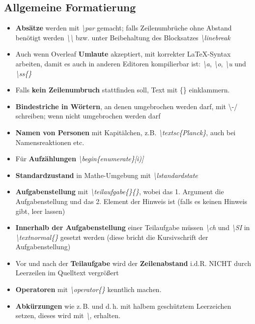 \documentclass[./main.tex]{subfiles}
\begin{document}
\subsection{Allgemeine Formatierung}
\begin{itemize}
    \item \textbf{Abs\"atze} werden mit \hypertarget{par}{\textit{\textbackslash par}} gemacht; falls Zeilenumbr\"uche ohne Abstand ben\"otigt werden \hypertarget{textbackslash}{\textit{\textbackslash\textbackslash}} bzw. unter Beibehaltung des Blocksatzes \textit{\hypertarget{linebreak}{\textbackslash linebreak}}
    \item Auch wenn Overleaf \textbf{Umlaute} akzeptiert, mit korrekter \LaTeX-Syntax arbeiten, damit es auch in anderen Editoren kompilierbar ist: \hypertarget{a}{\textit{\textbackslash\grqq{}a}}, \hypertarget{o}{\textit{\textbackslash\grqq{}o}}, \hypertarget{u}{\textit{\textbackslash\grqq{}u}} und \hypertarget{ss}{\textit{\textbackslash ss\{\}}}
    \item Falls \textbf{kein Zeilenumbruch} stattfinden soll, Text mit \{\} einklammern.  
    \item \textbf{Bindestriche in W\"ortern}, an denen umgebrochen werden darf, mit \textbackslash -/ schreiben; wenn nicht umgebrochen werden darf 
    \item \textbf{Namen von Personen} mit Kapit\"alchen, z.B. \hypertarget{textsc}{\textit{\textbackslash textsc\{Planck\}}}, auch bei Namensreaktionen etc.
    
    
    \item F\"ur \textbf{Aufz\"ahlungen} \hypertarget{beginenumerate}{\textit{\textbackslash begin\{enumerate\}[i)]}}
    \item \textbf{Standardzustand} in Mathe-Umgebung mit \textit{\hypertarget{lstandardstate}{\textbackslash lstandardstate}}
    \item \textbf{Aufgabenstellung} mit \textit{\textbackslash teilaufgabe\{\}\{\}}, wobei das 1. Argument die Aufgabenstellung und das 2. Element der Hinweis ist (falls es keinen Hinweis gibt, leer lassen)
    \item \hypertarget{textnormal}{} \textbf{Innerhalb der Aufgabenstellung} einer Teilaufgabe m\"ussen \textit{\textbackslash ch} und \textit{\textbackslash SI} in \textit{\textbackslash textnormal\{\}} gesetzt werden (diese bricht die Kursivschrift der Aufgabenstellung)
    \item Vor und nach der \textbf{Teilaufgabe} wird der \textbf{Zeilenabstand} i.d.R. NICHT durch Leerzeilen im Quelltext vergr\"o\ss{}ert
    \item \textbf{Operatoren} mit \textit{\hypertarget{operator}{\textbackslash operator\{\}}} kenntlich machen.
    \item \hypertarget{,}{} \textbf{Abk\"urzungen} wie z.\,B. und d.\,h. mit halbem gesch\"utztem Leerzeichen setzen, dieses wird mit \textit{\textbackslash ,} erhalten.
\end{itemize}
\end{document}
